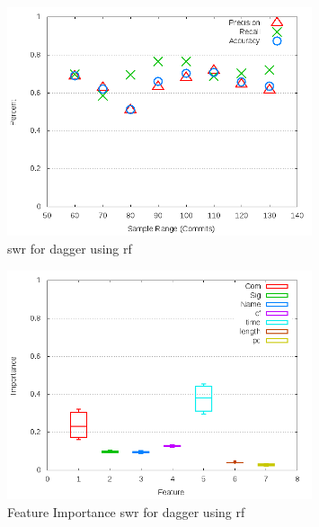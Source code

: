 \begin{figure}[!t]
\centering
\includegraphics[width=0.8\textwidth]{images/rf/test_1/dagger_sample_range.png}
\caption{\gls{swr} for dagger using \gls{rf}}
\label{fig:test_1_dagger_rf}
\end{figure}

\begin{figure}[!t]
\centering
\includegraphics[width=0.8\textwidth]{images/rf/test_1/dagger_importance.png}
\caption{Feature Importance \gls{swr} for dagger using \gls{rf}}
\label{fig:test_1_dagger_rf_importance}
\end{figure}

